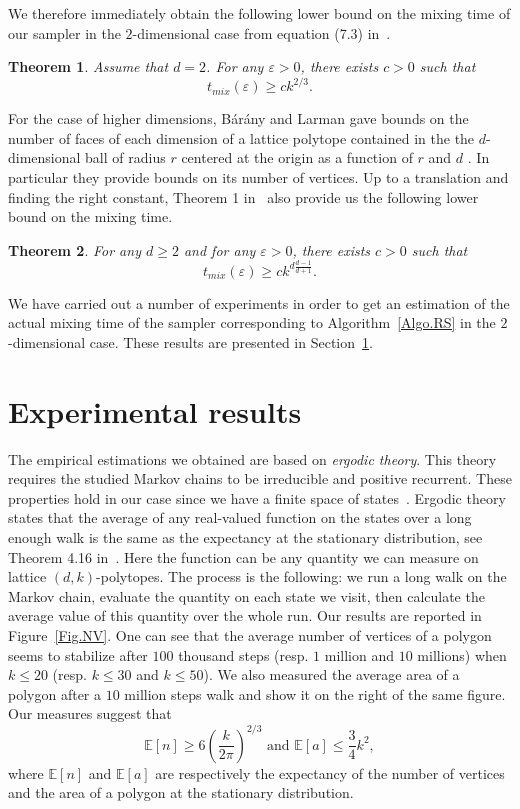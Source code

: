 \documentclass[a4paper]{article}
\newtheorem{theorem}{Theorem}
\begin{document}
We therefore immediately obtain the following lower bound on the mixing time of our sampler in the $2$-dimensional case from equation (7.3) in~\cite{levin2009markov}.

\begin{theorem}\label{Thm.Lowerbound}
Assume that $d=2$. For any $\varepsilon>0$, there exists $c>0$ such that
$$
t_{mix}(\varepsilon)\geq{ck^{2/3}}\mbox{.}
$$
\end{theorem}

For the case of higher dimensions,  B{\'a}r{\'a}ny and Larman gave bounds on the number of faces of each dimension of a lattice polytope contained in the the $d$-dimensional ball of radius $r$ centered at the origin as a function of $r$ and $d$ \cite{barany1998convex}. In particular they provide bounds on its number of vertices. Up to a translation and finding the right constant, Theorem 1 in~\cite{barany1998convex} also provide us the following lower bound on the mixing time.

\begin{theorem}
  For any $d\geq 2$ and for any $\varepsilon>0$, there exists $c>0$ such that
  $$
  t_{mix}(\varepsilon)\geq ck^{d \frac{d-1}{d+1}}\mbox{.}
  $$
\end{theorem}

We have carried out a number of experiments in order to get an estimation of the actual mixing time of the sampler corresponding to Algorithm~\ref{Algo.RS} in the $2$-dimensional case. These results are presented in Section~\ref{Sec.Res}.

\section{Experimental results}\label{Sec.Res}

The empirical estimations we obtained are based on \textit{ergodic theory}. This theory requires the studied Markov chains to be irreducible and positive recurrent. These properties hold in our case since we have a finite space of states~\cite{levin2009markov}. Ergodic theory states that the average of any real-valued function on the states over a long enough walk is the same as the expectancy at the stationary distribution, see Theorem 4.16 in~\cite{levin2009markov}. Here the function can be any quantity we can measure on lattice $(d,k)$-polytopes. The process is the following: we run a long walk on the Markov chain, evaluate the quantity on each state we visit, then calculate the average value of this quantity over the whole run.
Our results are reported in Figure~\ref{Fig.NV}. One can see that the average number of vertices of a polygon seems to stabilize after $100$ thousand steps (resp. $1$ million and $10$ millions) when $k\leq 20$ (resp. $k\leq 30$ and $k\leq 50$).
We also measured the average area of a polygon after a $10$ million steps walk and show it on the right of the same figure. Our measures suggest that
$$
\mathbb{E}[n] \ge 6\left(\frac{k}{2\pi}\right)^{2/3} \text{ and } \mathbb{E}[a] \leq \frac{3}{4} k^2,
$$
where $\mathbb{E}[n]$ and $\mathbb{E}[a]$ are respectively the expectancy of the number of vertices and the area of a polygon at the stationary distribution.
\end{document}
